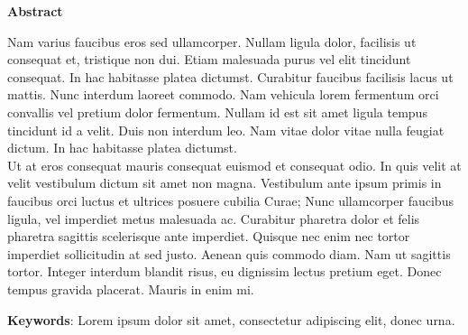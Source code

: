 
\begin{center}

\textbf{}

\vspace{2cm}

\Large{\textbf{Abstract}}

\end{center}

\vspace{1cm}

Nam varius faucibus eros sed ullamcorper. Nullam ligula dolor, facilisis ut consequat et, tristique non dui. Etiam malesuada purus vel elit tincidunt consequat. In hac habitasse platea dictumst. Curabitur faucibus facilisis lacus ut mattis. Nunc interdum laoreet commodo. Nam vehicula lorem fermentum orci convallis vel pretium dolor fermentum. Nullam id est sit amet ligula tempus tincidunt id a velit. Duis non interdum leo. Nam vitae dolor vitae nulla feugiat dictum. In hac habitasse platea dictumst.\\

Ut at eros consequat mauris consequat euismod et consequat odio. In quis velit at velit vestibulum dictum sit amet non magna. Vestibulum ante ipsum primis in faucibus orci luctus et ultrices posuere cubilia Curae; Nunc ullamcorper faucibus ligula, vel imperdiet metus malesuada ac. Curabitur pharetra dolor et felis pharetra sagittis scelerisque ante imperdiet. Quisque nec enim nec tortor imperdiet sollicitudin at sed justo. Aenean quis commodo diam. Nam ut sagittis tortor. Integer interdum blandit risus, eu dignissim lectus pretium eget. Donec tempus gravida placerat. Mauris in enim mi.

\vspace{1cm}

\textbf{Keywords}: Lorem ipsum dolor sit amet, consectetur adipiscing elit, donec urna.

\vspace{3cm}


